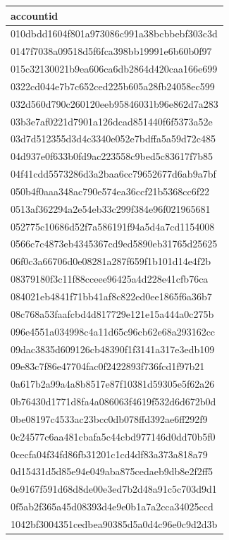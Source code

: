 \begin{tabular}{l}
\toprule
accountid \\
\midrule
010dbdd1604f801a973086c991a38bcbbebf303c3d \\
0147f7038a09518d5f6fca398bb19991e6b60b0f97 \\
015c32130021b9ea606ca6db2864d420caa166e699 \\
0322cd044e7b7c652ced225b605a28fb24058ec599 \\
032d560d790c260120eeb95846031b96e862d7a283 \\
03b3e7af0221d7901a126dcad851440f6f5373a52e \\
03d7d512355d3d4c3340e052e7bdffa5a59d72c485 \\
04d937e0f633b0fd9ac223558c9bed5c83617f7b85 \\
04f41cdd5573286d3a2baa6cc79652677d6ab9a7bf \\
050b4f0aaa348ac790e574ea36ccf21b5368cc6f22 \\
0513af362294a2e54eb33c299f384e96f021965681 \\
052775c10686d52f7a586191f94a5d4a7cd1154008 \\
0566c7c4873eb4345367cd9ed5890eb31765d25625 \\
06f0c3a66706d0e08281a287f659f1b101d14e4f2b \\
08379180f3c11f88cceee96425a4d228e41cfb76ca \\
084021eb4841f71bb41af8c822ed0ee1865f6a36b7 \\
08c768a53faafcbd4d817729e121e15a444a0c275b \\
096e4551a034998c4a11d65c96cb62e68a293162cc \\
09dac3835d609126cb48390f1f3141a317e3edb109 \\
09e83c7f86e47704fac0f2422893f736fcd1f97b21 \\
0a617b2a99a4a8b8517e87f10381d59305e5f62a26 \\
0b76430d1771d8fa4a086063f4619f532d6d672b0d \\
0be08197c4533ac23bcc0db078ffd392ae6ff292f9 \\
0c24577c6aa481cbafa5c44cbd977146d0dd70b5f0 \\
0cecfa04f34fd86fb31201c1cd4df83a373a818a79 \\
0d15431d5d85e94e049aba875cedaeb9db8e2f2ff5 \\
0e9167f591d68d8de00e3ed7b2d48a91c5c703d9d1 \\
0f5ab2f365a45d08393d4e9e0b1a7a2cca34025ccd \\
1042bf3004351cedbea90385d5a0d4c96e0c9d2d3b \\

\end{tabular}
